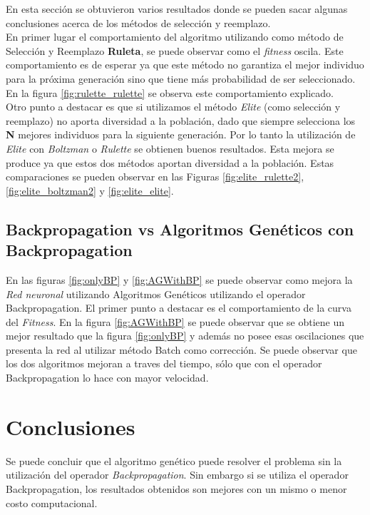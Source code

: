 \documentclass{sig-alternate}
\begin{document}
		En esta sección se obtuvieron varios resultados donde se pueden sacar algunas conclusiones acerca de los métodos de selección y reemplazo.\\
		En primer lugar el comportamiento del algoritmo utilizando como método de Selección y Reemplazo \textbf{Ruleta}, se puede observar como el \textit{fitness} oscila. Este comportamiento es de esperar ya que este método no garantiza el mejor individuo para la próxima generación sino que tiene más probabilidad de ser seleccionado. En la figura \ref{fig:rulette_rulette} se observa este comportamiento explicado.\\
		Otro punto a destacar es que si utilizamos el método \textit{Elite} (como selección y reemplazo) no aporta diversidad a la población, dado que siempre selecciona los \textbf{N} mejores individuos para la siguiente generación. Por lo tanto la utilización de \textit{Elite} con \textit{Boltzman} o \textit{Rulette} se obtienen buenos resultados. Esta mejora se produce ya que estos dos métodos aportan diversidad a la población. Estas comparaciones se pueden observar en las Figuras \ref{fig:elite_rulette2}, \ref{fig:elite_boltzman2} y \ref{fig:elite_elite}.


		\subsection{Backpropagation vs Algoritmos Genéticos con Backpropagation}

		En las figuras \ref{fig:onlyBP} y \ref{fig:AGWithBP} se puede observar como mejora la \textit{Red neuronal} utilizando Algoritmos Genéticos utilizando el operador
		Backpropagation.
		El primer punto a destacar es el comportamiento de la curva del \textit{Fitness}.
		En la figura \ref{fig:AGWithBP} se puede observar que se obtiene un mejor resultado que la figura \ref{fig:onlyBP} y además no posee esas oscilaciones que presenta la red al utilizar método Batch como corrección. Se puede observar que los dos algoritmos mejoran a traves del tiempo, sólo que con el operador Backpropagation lo hace con mayor velocidad.
		
		\section{Conclusiones}
		
		Se puede concluir que el algoritmo genético puede resolver el problema sin la utilización del operador \textit{Backpropagation}.
		Sin embargo si se utiliza el operador Backpropagation, los resultados obtenidos son mejores con un mismo o menor costo computacional.
\end{document}

